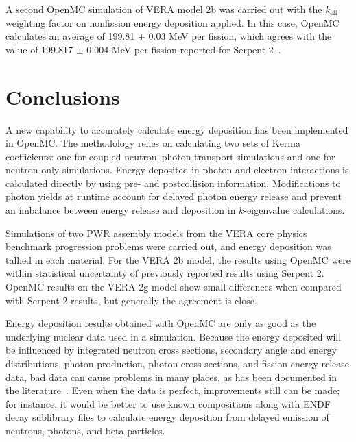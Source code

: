 \documentclass{anstrans}
\begin{document}
A second OpenMC simulation of VERA model 2b was carried out with the
$k_\text{eff}$ weighting factor on nonfission energy deposition applied. In
this case, OpenMC calculates an average of 199.81 $\pm$ 0.03 MeV per fission,
which agrees with the value of 199.817 $\pm$ 0.004 MeV per fission reported for
Serpent 2~\cite{tuominen2019ane}.


\section{Conclusions}

A new capability to accurately calculate energy deposition has been implemented
in OpenMC. The methodology relies on calculating two sets of Kerma coefficients:
one for coupled neutron--photon transport simulations and one for neutron-only
simulations. Energy deposited in photon and electron interactions is calculated
directly by using pre- and postcollision information. Modifications to photon
yields at runtime account for delayed photon energy release and prevent an
imbalance between energy release and deposition in $k$-eigenvalue calculations.

Simulations of two PWR assembly models from the VERA core physics benchmark
progression problems were carried out, and energy deposition was tallied in each
material. For the VERA 2b model, the results using OpenMC were within
statistical uncertainty of previously reported results using Serpent 2. OpenMC
results on the VERA 2g model show small differences when compared with Serpent 2
results, but generally the agreement is close.

Energy deposition results obtained with OpenMC are only as good as the
underlying nuclear data used in a simulation. Because the energy deposited will
be influenced by integrated neutron cross sections, secondary angle and energy
distributions, photon production, photon cross sections, and fission energy
release data, bad data can cause problems in many places, as has
been documented in the
literature~\cite{trumbull2013mc,tuominen2019ane}. Even when the data is
perfect, improvements still can be made; for instance, it would be
better to use known compositions along with ENDF decay sublibrary files to
calculate energy deposition from delayed emission of neutrons, photons, and beta
particles.

\pagebreak

\end{document}
